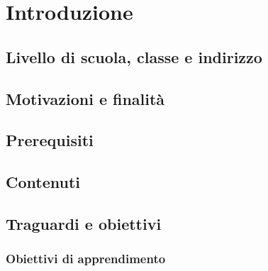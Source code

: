 \chapter{Introduzione}

\section{Livello di scuola, classe e indirizzo}


\section{Motivazioni e finalità}

\section{Prerequisiti}

\section{Contenuti}

\section{Traguardi e obiettivi}

\subsection{Obiettivi di apprendimento}

